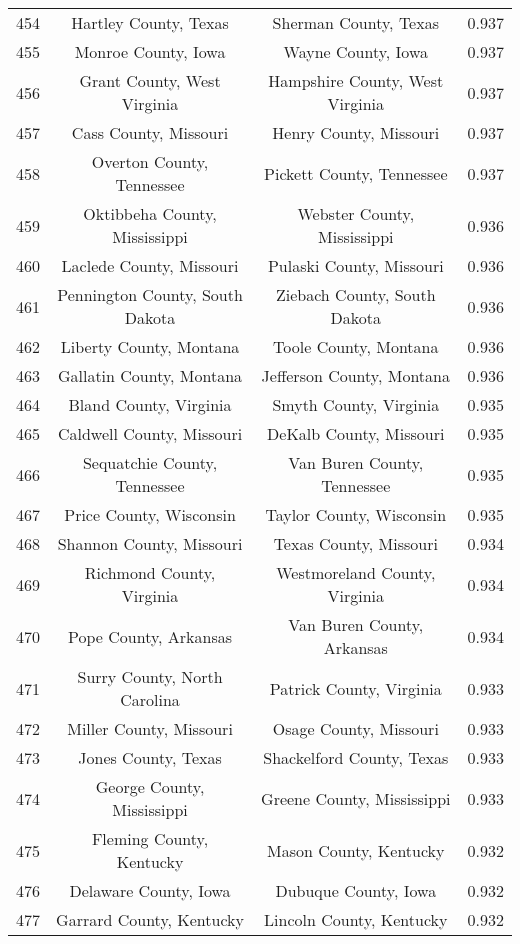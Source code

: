 \begin{longtable}{cccc}
  454 & Hartley County, Texas & Sherman County, Texas & 0.937 \\ 
  455 & Monroe County, Iowa & Wayne County, Iowa & 0.937 \\ 
  456 & Grant County, West Virginia & Hampshire County, West Virginia & 0.937 \\ 
  457 & Cass County, Missouri & Henry County, Missouri & 0.937 \\ 
  458 & Overton County, Tennessee & Pickett County, Tennessee & 0.937 \\ 
  459 & Oktibbeha County, Mississippi & Webster County, Mississippi & 0.936 \\ 
  460 & Laclede County, Missouri & Pulaski County, Missouri & 0.936 \\ 
  461 & Pennington County, South Dakota & Ziebach County, South Dakota & 0.936 \\ 
  462 & Liberty County, Montana & Toole County, Montana & 0.936 \\ 
  463 & Gallatin County, Montana & Jefferson County, Montana & 0.936 \\ 
  464 & Bland County, Virginia & Smyth County, Virginia & 0.935 \\ 
  465 & Caldwell County, Missouri & DeKalb County, Missouri & 0.935 \\ 
  466 & Sequatchie County, Tennessee & Van Buren County, Tennessee & 0.935 \\ 
  467 & Price County, Wisconsin & Taylor County, Wisconsin & 0.935 \\ 
  468 & Shannon County, Missouri & Texas County, Missouri & 0.934 \\ 
  469 & Richmond County, Virginia & Westmoreland County, Virginia & 0.934 \\ 
  470 & Pope County, Arkansas & Van Buren County, Arkansas & 0.934 \\ 
  471 & Surry County, North Carolina & Patrick County, Virginia & 0.933 \\ 
  472 & Miller County, Missouri & Osage County, Missouri & 0.933 \\ 
  473 & Jones County, Texas & Shackelford County, Texas & 0.933 \\ 
  474 & George County, Mississippi & Greene County, Mississippi & 0.933 \\ 
  475 & Fleming County, Kentucky & Mason County, Kentucky & 0.932 \\ 
  476 & Delaware County, Iowa & Dubuque County, Iowa & 0.932 \\ 
  477 & Garrard County, Kentucky & Lincoln County, Kentucky & 0.932 \\ 

\end{longtable}
